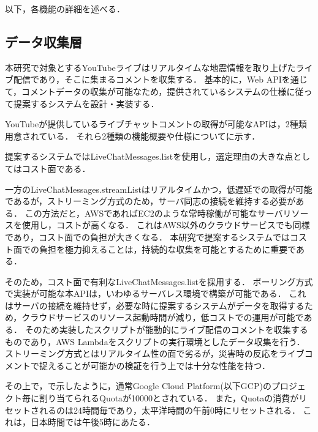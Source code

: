   

  
  以下，各機能の詳細を述べる．

  \subsection{データ収集層}
  本研究で対象とするYouTubeライブはリアルタイムな地震情報を取り上げたライブ配信であり，そこに集まるコメントを収集する\cite{youtube}．
  基本的に，Web APIを通じて，コメントデータの収集が可能なため，提供されているシステムの仕様に従って提案するシステムを設計・実装する．

  YouTubeが提供しているライブチャットコメントの取得が可能なAPIは，2種類用意されている\cite{livechat_list, livechat_stream}．
  それら2種類の機能概要や仕様についてに示す．
  
  
  
  提案するシステムではLiveChatMessages.list\cite{livechat_list}を使用し，選定理由の大きな点としてはコスト面である．

  一方のLiveChatMessages.streamListはリアルタイムかつ，低遅延での取得が可能であるが，ストリーミング方式のため，サーバ同志の接続を維持する必要がある．
  この方法だと，AWSであればEC2のような常時稼働が可能なサーバリソースを使用し，コストが高くなる．
  これはAWS以外のクラウドサービスでも同様であり，コスト面での負担が大きくなる．
  本研究で提案するシステムではコスト面での負担を極力抑えることは，持続的な収集を可能とするために重要である．

  そのため，コスト面で有利なLiveChatMessages.listを採用する．
  ポーリング方式で実装が可能な本APIは，いわゆるサーバレス環境で構築が可能である．
  これはサーバの接続を維持せず，必要な時に提案するシステムがデータを取得するため，クラウドサービスのリソース起動時間が減り，低コストでの運用が可能である．
  そのため実装したスクリプトが能動的にライブ配信のコメントを収集するものであり，AWS Lambdaをスクリプトの実行環境としたデータ収集を行う．
  ストリーミング方式とはリアルタイム性の面で劣るが，災害時の反応をライブコメントで捉えることが可能かの検証を行う上では十分な性能を持つ．

  その上で，で示したように，通常Google Cloud Platform(以下GCP)のプロジェクト毎に割り当てられるQuotaが10000とされている．
  また，Quotaの消費がリセットされるのは24時間毎であり，太平洋時間の午前0時にリセットされる．
  これは，日本時間では午後5時にあたる．

